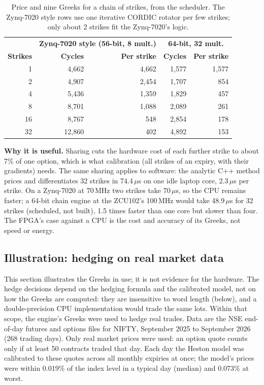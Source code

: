 \documentclass[11pt,a4paper]{article}
\newcommand{\useful}[1]{\par\noindent\textbf{\textcolor{accent}{Why it is useful.}} #1\par}
\begin{document}
\begin{table}[H]
\centering
\small
\begin{tabular}{@{}rrrrr@{}}
\toprule
& \multicolumn{2}{c}{\textbf{Zynq-7020 style (56-bit, 8 mult.)}} & \multicolumn{2}{c}{\textbf{64-bit, 32 mult.}}\\
\textbf{Strikes} & \textbf{Cycles} & \textbf{Per strike} & \textbf{Cycles} & \textbf{Per strike}\\
\midrule
1 & 4,662 & 4,662 & 1,577 & 1,577\\
2 & 4,907 & 2,454 & 1,707 & 854\\
4 & 5,436 & 1,359 & 1,829 & 457\\
8 & 8,701 & 1,088 & 2,089 & 261\\
16 & 8,767 & 548 & 2,854 & 178\\
32 & 12,860 & 402 & 4,892 & 153\\
\bottomrule
\end{tabular}
\caption{Price and nine Greeks for a chain of strikes, from the scheduler. The Zynq-7020
style rows use one iterative CORDIC rotator per few strikes; only about 2 strikes fit the
Zynq-7020's logic.}
\end{table}

\useful{Sharing cuts the hardware cost of each further strike to about 7\% of one option,
which is what calibration (all strikes of an expiry, with their gradients) needs. The
same sharing applies to software: the analytic C++ method prices and differentiates 32
strikes in 74.4\,$\mu$s on one idle laptop core, 2.3\,$\mu$s per strike. On a
Zynq-7020 at 70\,MHz two strikes take 70\,$\mu$s, so the CPU remains faster; a 64-bit
chain engine at the ZCU102's 100\,MHz would take 48.9\,$\mu$s for 32 strikes (scheduled,
not built), 1.5 times faster than one core but slower than four. The FPGA's case against a CPU is the cost and accuracy of its Greeks, not speed or
energy.}

\subsection{Illustration: hedging on real market data}
\label{sec:hedging}
This section illustrates the Greeks in use; it is not evidence for the hardware. The
hedge decisions depend on the hedging formula and the calibrated model, not on how the
Greeks are computed: they are insensitive to word length (below), and a double-precision
CPU implementation would trade the same lots. Within that scope, the engine's Greeks
were used to hedge real trades. Data are the NSE end-of-day futures and options files for NIFTY,
September 2025 to September 2026 (268 trading days). Only real market prices were used:
an option quote counts only if at least 50 contracts traded that day. Each day the
Heston model was calibrated to these quotes across all monthly expiries at once; the
model's prices were within 0.019\% of the index level in a typical day (median) and
0.073\% at worst.
\end{document}
